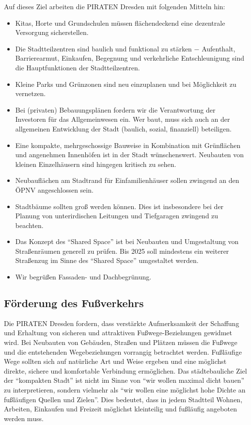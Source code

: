 \documentclass[a4paper, 11pt]{article}
\begin{document}
Auf dieses Ziel arbeiten die PIRATEN Dresden mit folgenden Mitteln hin:

\begin{itemize}
    \item Kitas, Horte und Grundschulen müssen flächendeckend eine dezentrale Versorgung sicherstellen.
    \item Die Stadtteilzentren sind baulich und funktional zu stärken $-$ Aufenthalt, Barrierearmut, Einkaufen, Begegnung und verkehrliche Entschleunigung sind die Hauptfunktionen der Stadtteilzentren.
    \item Kleine Parks und Grünzonen sind neu einzuplanen und bei Möglichkeit zu vernetzen.
    \item Bei (privaten) Bebauungsplänen fordern wir die Verantwortung der Investoren für das Allgemeinwesen ein. Wer baut, muss sich auch an der allgemeinen Entwicklung der Stadt (baulich, sozial, finanziell) beteiligen.
    \item Eine kompakte, mehrgeschossige Bauweise in Kombination mit Grünflächen und angenehmen Innenhöfen ist in der Stadt wünschenswert. Neubauten von kleinen Einzelhäusern sind hingegen kritisch zu sehen.
    \item Neubauflächen am Stadtrand für Einfamilienhäuser sollen zwingend an den ÖPNV angeschlossen sein.
    \item Stadtbäume sollten groß werden können. Dies ist insbesondere bei der Planung von unterirdischen Leitungen und Tiefgaragen zwingend zu beachten.
    \item Das Konzept des ``Shared Space'' ist bei Neubauten und Umgestaltung von Straßenräumen generell zu prüfen. Bis 2025 soll mindestens ein weiterer Straßenzug im Sinne des ``Shared Space'' umgestaltet werden.
    \item Wir begrüßen Fassaden- und Dachbegrünung.
\end{itemize}

\subsection{Förderung des Fußverkehrs}
Die PIRATEN Dresden fordern, dass verstärkte Aufmerksamkeit der Schaffung und Erhaltung von sicheren und attraktiven Fußwege-Beziehungen gewidmet wird. Bei Neubauten von Gebäuden, Straßen und Plätzen müssen die Fußwege und die entstehenden Wegebeziehungen vorrangig betrachtet werden. Fußläufige Wege sollten sich auf natürliche Art und Weise ergeben und eine möglichst direkte, sichere und komfortable Verbindung ermöglichen. Das städtebauliche Ziel der ``kompakten Stadt'' ist nicht im Sinne von ``wir wollen maximal dicht bauen'' zu interpretieren, sondern vielmehr als ``wir wollen eine möglichst hohe Dichte an fußläufigen Quellen und Zielen''. Dies bedeutet, dass in jedem Stadtteil Wohnen, Arbeiten, Einkaufen und Freizeit möglichst kleinteilig und fußläufig angeboten werden muss.
\end{document}
